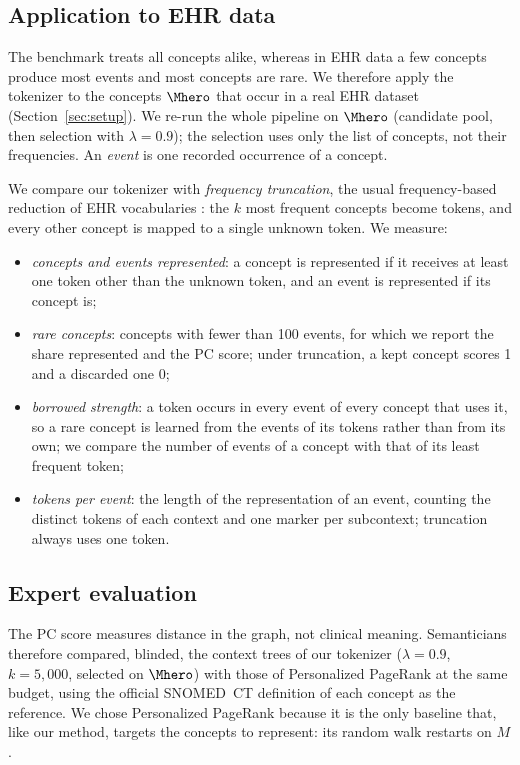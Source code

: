 \subsection{Application to EHR data}
\label{sec:method:ehr}

The benchmark treats all concepts alike, whereas in EHR data a few concepts produce most events and most concepts are rare.
We therefore apply the tokenizer to the concepts $\Mhero$ that occur in a real EHR dataset (Section~\ref{sec:setup}).
We re-run the whole pipeline on $\Mhero$ (candidate pool, then selection with $\lambda = 0.9$); the selection uses only the list of concepts, not their frequencies.
An \emph{event} is one recorded occurrence of a concept.

We compare our tokenizer with \emph{frequency truncation}, the usual frequency-based reduction of EHR vocabularies \cite{steinberg2021language}: the $k$ most frequent concepts become tokens, and every other concept is mapped to a single unknown token.
We measure:
\begin{itemize}
    \item \emph{concepts and events represented}: a concept is represented if it receives at least one token other than the unknown token, and an event is represented if its concept is;
    \item \emph{rare concepts}: concepts with fewer than 100 events, for which we report the share represented and the PC score; under truncation, a kept concept scores 1 and a discarded one 0;
    \item \emph{borrowed strength}: a token occurs in every event of every concept that uses it, so a rare concept is learned from the events of its tokens rather than from its own; we compare the number of events of a concept with that of its least frequent token;
    \item \emph{tokens per event}: the length of the representation of an event, counting the distinct tokens of each context and one marker per subcontext; truncation always uses one token.
\end{itemize}

\subsection{Expert evaluation}
\label{sec:method:expert}

The PC score measures distance in the graph, not clinical meaning.
Semanticians therefore compared, blinded, the context trees of our tokenizer ($\lambda = 0.9$, $k = 5{,}000$, selected on $\Mhero$) with those of Personalized PageRank at the same budget, using the official SNOMED~CT definition of each concept as the reference.
We chose Personalized PageRank because it is the only baseline that, like our method, targets the concepts to represent: its random walk restarts on $M$. 

